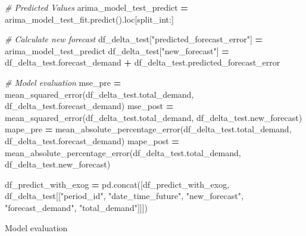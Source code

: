 \documentclass[mstat,12pt]{unswthesis}
\newenvironment{Shaded}{\begin{snugshade}}{\end{snugshade}}
\newcommand{\CommentTok}[1]{\textcolor[rgb]{0.56,0.35,0.01}{\textit{#1}}}
\newcommand{\NormalTok}[1]{#1}
\newcommand{\OperatorTok}[1]{\textcolor[rgb]{0.81,0.36,0.00}{\textbf{#1}}}
\newcommand{\StringTok}[1]{\textcolor[rgb]{0.31,0.60,0.02}{#1}}
\begin{document}
\begin{Shaded}
\begin{Highlighting}[]
    \CommentTok{\# Predicted Values}
\NormalTok{    arima\_model\_test\_predict }\OperatorTok{=} 
\NormalTok{      arima\_model\_test\_fit.predict().loc[split\_int:]}

    \CommentTok{\# Calculate new forecast}
\NormalTok{    df\_delta\_test[}\StringTok{"predicted\_forecast\_error"}\NormalTok{] }\OperatorTok{=}\NormalTok{ arima\_model\_test\_predict}
\NormalTok{    df\_delta\_test[}\StringTok{"new\_forecast"}\NormalTok{] }\OperatorTok{=}\NormalTok{ df\_delta\_test.forecast\_demand }
        \OperatorTok{+}\NormalTok{ df\_delta\_test.predicted\_forecast\_error}

    \CommentTok{\# Model evaluation}
\NormalTok{    mse\_pre }\OperatorTok{=}\NormalTok{ mean\_squared\_error(df\_delta\_test.total\_demand,}
\NormalTok{        df\_delta\_test.forecast\_demand)}
\NormalTok{    mse\_post }\OperatorTok{=}\NormalTok{ mean\_squared\_error(df\_delta\_test.total\_demand,}
\NormalTok{        df\_delta\_test.new\_forecast)}
\NormalTok{    mape\_pre }\OperatorTok{=}\NormalTok{ mean\_absolute\_percentage\_error(df\_delta\_test.total\_demand,}
\NormalTok{        df\_delta\_test.forecast\_demand)}
\NormalTok{    mape\_post }\OperatorTok{=}\NormalTok{ mean\_absolute\_percentage\_error(df\_delta\_test.total\_demand,}
\NormalTok{        df\_delta\_test.new\_forecast)}

\NormalTok{    df\_predict\_with\_exog }\OperatorTok{=}\NormalTok{ pd.concat([df\_predict\_with\_exog, }
\NormalTok{        df\_delta\_test[[}\StringTok{"period\_id"}\NormalTok{, }\StringTok{"date\_time\_future"}\NormalTok{, }
            \StringTok{"new\_forecast"}\NormalTok{, }\StringTok{"forecast\_demand"}\NormalTok{, }\StringTok{"total\_demand"}\NormalTok{]]])}
\end{Highlighting}
\end{Shaded}

Model evaluation
\end{document}

